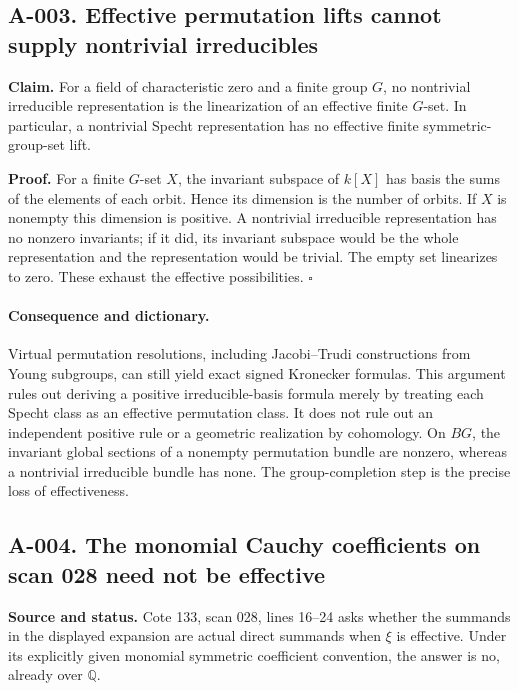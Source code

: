 \documentclass[11pt]{article}
\begin{document}
\subsection*{A-003. Effective permutation lifts cannot supply nontrivial irreducibles}
\textbf{Claim.} For a field of characteristic zero and a finite group $G$,
no nontrivial irreducible representation is the linearization of an effective
finite $G$-set.  In particular, a nontrivial Specht representation has no
effective finite symmetric-group-set lift.

\textbf{Proof.} For a finite $G$-set $X$, the invariant subspace of $k[X]$
has basis the sums of the elements of each orbit.  Hence its dimension is
the number of orbits.  If $X$ is nonempty this dimension is positive.  A
nontrivial irreducible representation has no nonzero invariants; if it did,
its invariant subspace would be the whole representation and the
representation would be trivial.  The empty set linearizes to zero.
These exhaust the effective possibilities. \hfill$\square$

\paragraph{Consequence and dictionary.}
Virtual permutation resolutions, including Jacobi--Trudi constructions from
Young subgroups, can still yield exact signed Kronecker formulas.  This
argument rules out deriving a positive irreducible-basis formula merely by
treating each Specht class as an effective permutation class.  It does not
rule out an independent positive rule or a geometric realization by
cohomology.  On $BG$, the invariant global sections of a nonempty
permutation bundle are nonzero, whereas a nontrivial irreducible bundle has
none.  The group-completion step is the precise loss of effectiveness.

\subsection*{A-004. The monomial Cauchy coefficients on scan 028 need not be effective}
\textbf{Source and status.} Cote 133, scan 028, lines 16--24 asks whether
the summands in the displayed expansion are actual direct summands when
$\xi$ is effective.  Under its explicitly given monomial symmetric
coefficient convention, the answer is no, already over $\mathbb Q$.
\end{document}
